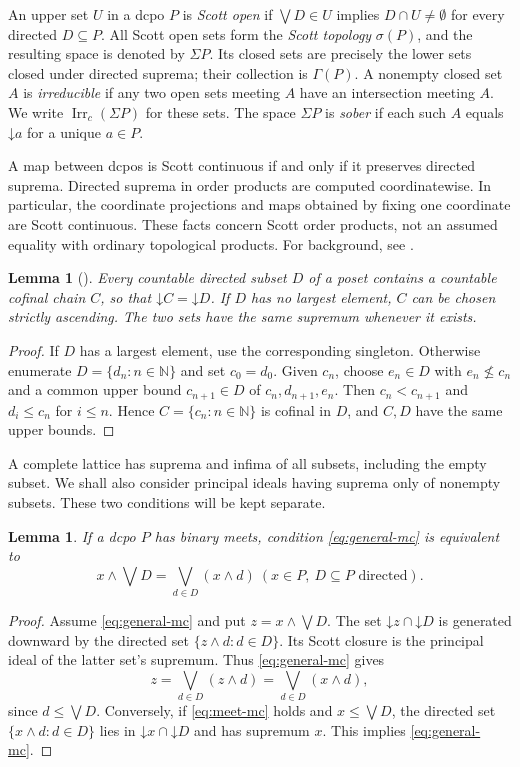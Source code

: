 \documentclass[10pt,a4paper]{amsart}
\newtheorem{lemma}[theorem]{Lemma}
\numberwithin{equation}{section}
\newcommand{\N}{\mathbb N}
\newcommand{\down}[1]{\mathord{\downarrow}#1}
\newcommand{\Sc}{\sigma}
\newcommand{\Sig}{\Sigma}
\newcommand{\mc}{\wedge}
\begin{document}
An upper set $U$ in a dcpo $P$ is \emph{Scott open} if $\bigvee D\in U$ implies $D\cap U\ne\emptyset$ for every directed $D\subseteq P$. All Scott open sets form the \emph{Scott topology} $\Sc(P)$, and the resulting space is denoted by $\Sig P$. Its closed sets are precisely the lower sets closed under directed suprema; their collection is $\Gamma(P)$. A nonempty closed set $A$ is \emph{irreducible} if any two open sets meeting $A$ have an intersection meeting $A$. We write $\operatorname{Irr}_c(\Sig P)$ for these sets. The space $\Sig P$ is \emph{sober} if each such $A$ equals $\down a$ for a unique $a\in P$.

A map between dcpos is Scott continuous if and only if it preserves directed suprema. Directed suprema in order products are computed coordinatewise. In particular, the coordinate projections and maps obtained by fixing one coordinate are Scott continuous. These facts concern Scott order products, not an assumed equality with ordinary topological products. For background, see \cite{AbramskyJung,Gierz}.

\begin{lemma}[{\cite[Lemma~1]{LawsonXuLower}}]\label{lem:cofinal-chain}
Every countable directed subset $D$ of a poset contains a countable cofinal chain $C$, so that $\down C=\down D$. If $D$ has no largest element, $C$ can be chosen strictly ascending. The two sets have the same supremum whenever it exists.
\end{lemma}
\begin{proof}
If $D$ has a largest element, use the corresponding singleton. Otherwise enumerate $D=\{d_n:n\in\N\}$ and set $c_0=d_0$. Given $c_n$, choose $e_n\in D$ with $e_n\nleq c_n$ and a common upper bound $c_{n+1}\in D$ of $c_n,d_{n+1},e_n$. Then $c_n<c_{n+1}$ and $d_i\le c_n$ for $i\le n$. Hence $C=\{c_n:n\in\N\}$ is cofinal in $D$, and $C,D$ have the same upper bounds.
\end{proof}

A complete lattice has suprema and infima of all subsets, including the empty subset. We shall also consider principal ideals having suprema only of nonempty subsets. These two conditions will be kept separate.

\begin{lemma}\label{lem:meet-mc}
If a dcpo $P$ has binary meets, condition \eqref{eq:general-mc} is equivalent to
\begin{equation}\label{eq:meet-mc}
 x\mc\bigvee D=\bigvee_{d\in D}(x\mc d)
 ~(x\in P,\ D\subseteq P\text{ directed}).
\end{equation}
\end{lemma}
\begin{proof}
Assume \eqref{eq:general-mc} and put $z=x\mc\bigvee D$. The set $\down z\cap\down D$ is generated downward by the directed set $\{z\mc d:d\in D\}$. Its Scott closure is the principal ideal of the latter set's supremum. Thus \eqref{eq:general-mc} gives
\[
 z=\bigvee_{d\in D}(z\mc d)=\bigvee_{d\in D}(x\mc d),
\]
since $d\le\bigvee D$. Conversely, if \eqref{eq:meet-mc} holds and $x\le\bigvee D$, the directed set $\{x\mc d:d\in D\}$ lies in $\down x\cap\down D$ and has supremum $x$. This implies \eqref{eq:general-mc}.
\end{proof}
\end{document}
